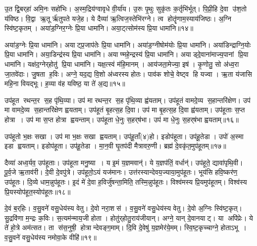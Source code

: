 उ॒त द्वि॒बर्‌हा॑ अमि॒नः सहो॑भिः।
अ॒स्म॒द्रिय॑ग्वावृधे वी॒र्या॑य।
उ॒रुः पृ॒थुः सुकृ॑तः क॒र्तृभि॑र्भूत्।
पि॒प्री॒हि दे॒वा उ॑श॒तो य॑विष्ठ।
वि॒द्वा ऋ॒तूर्\mbox{}ऋ॑तुपते यजे॒ह।
ये दैव्या॑ ऋ॒त्विज॒स्तेभि॑रग्ने।
त्व होतॄ॑णाम॒स्याय॑जिष्ठः।
अ॒ग्नि स्वि॑ष्ट॒कृतम्।
अया॑ड॒ग्निर॒ग्नेः प्रि॒या धामा॑नि।
अया॒ट्त्सोम॑स्य प्रि॒या धामा॑नि॥१४॥

अया॑ड॒ग्नेः प्रि॒या धामा॑नि।
अयाट्प्र॒जाप॑तेः प्रि॒या धामा॑नि।
अया॑ड॒ग्नीषोम॑योः प्रि॒या धामा॑नि।
अया॑डिन्द्राग्नि॒योः प्रि॒या धामा॑नि।
अया॒डिन्द्र॑स्य प्रि॒या धामा॑नि।
अयाण्महे॒न्द्रस्य॑ प्रि॒या धामा॑नि।
अयाड्दे॒वाना॑माज्य॒पानां प्रि॒या धामा॑नि।
यक्ष॑द॒ग्नेर्‌होतु॑ प्रि॒या धामा॑नि।
यक्ष॒त्स्वं म॑हि॒मानम्।
आय॑जता॒मेज्या॒ इष॑।
कृ॒णोतु॒ सो अ॑ध्व॒रा जा॒तवे॑दाः।
जु॒षता ह॒विः।
अग्ने॒ यद॒द्य वि॒शो अ॑ध्वरस्य होतः।
पाव॑क शोचे॒ वेष्ट्व हि यज्वा।
ऋ॒ता य॑जासि महि॒ना वियद्भूः।
ह॒व्या व॑ह यविष्ठ॒ या ते॑ अ॒द्य॥१५॥\anuvakamend[अ॒स्त्व॒ध॒त्त॒ र॒यिं च॑र्‌षणि॒प्राः सोम॑स्य प्रि॒या धामा॒नीष॒ष्षट्च॑]

उप॑हूत रथन्त॒र स॒ह पृ॑थि॒व्या।
उप॑ मा रथन्त॒र स॒ह पृ॑थि॒व्या ह्व॑यताम्।
उप॑हूतं वामदे॒व्य स॒हान्तरि॑क्षेण।
उप॑ मा वामदे॒व्य स॒हान्तरि॑क्षेण ह्वयताम्।
उप॑हूतं बृ॒हत्स॒ह दि॒वा।
उप॑ मा बृ॒हत्स॒ह दि॒वा ह्व॑यताम्।
उप॑हूताः स॒प्त होत्रा।
उप॑ मा स॒प्त होत्रा ह्वयन्ताम्।
उप॑हूता धे॒नुः स॒हर्‌ष॑भा।
उप॑ मा धे॒नुः स॒हर्‌ष॑भा ह्वयताम्॥१६॥

उप॑हूतो भ॒क्षः सखा।
उप॑ मा भ॒क्षः सखा ह्वयताम्।
उप॑हू॒ताँ(४)हो।
इडोप॑हूता।
उप॑हू॒तेडा।
उपो॑ अ॒स्मा इडा ह्वयताम्।
इडोप॑हूता।
उप॑हू॒तेडा।
मा॒न॒वी घृ॒तप॑दी मैत्रावरु॒णी।
ब्रह्म॑ दे॒वकृ॑त॒मुप॑हूतम्॥१७॥

दैव्या॑ अध्व॒र्यव॒ उप॑हूताः।
उप॑हूता मनु॒ष्या।
य इ॒मं य॒ज्ञमवान्॑।
ये य॒ज्ञप॑तिं॒ वर्धान्॑।
उप॑हूते॒ द्यावा॑पृथि॒वी।
पू॒र्व॒जे ऋ॒ताव॑री।
दे॒वी दे॒वपु॑त्रे।
उप॑हूतो॒ऽयं यज॑मानः।
उत्त॑रस्यान्देवय॒ज्याया॒मुप॑हूतः।
भूय॑सि हवि॒ष्कर॑ण॒ उप॑हूतः।
दि॒व्ये धाम॒न्नुप॑हूतः।
इ॒दं मे॑ दे॒वा ह॒विर्जु॑षन्ता॒मिति॒ तस्मि॒न्नुप॑हूतः।
विश्व॑मस्य प्रि॒यमुप॑हूतम्।
विश्व॑स्य प्रि॒यस्योप॑हूत॒स्योप॑हूतः॥१८॥\anuvakamend[स॒हर्‌ष॑भा ह्वयता॒मुप॑हूत हवि॒ष्कर॑ण॒ उप॑हूतश्च॒त्वारि॑ च]

दे॒वं ब॒र्‌हिः।
व॒सु॒वने॑ वसु॒धेय॑स्य वेतु।
दे॒वो नरा॒शस॑।
व॒सु॒वने॑ वसु॒धेय॑स्य वेतु।
दे॒वो अ॒ग्निः स्वि॑ष्ट॒कृत्।
सु॒द्रवि॑णा म॒न्द्रः क॒विः।
स॒त्यम॑न्माय॒जी होता।
होतु॑र्‌होतु॒राय॑जीयान्।
अग्ने॒ यान् दे॒वानयाट्।
या अपि॑प्रेः।
ये ते॑ हो॒त्रे अम॑त्सत।
ता स॑स॒नुषी॒ होत्रान्देवङ्ग॒माम्।
दि॒वि दे॒वेषु॑ य॒ज्ञमेर॑ये॒मम्।
स्वि॒ष्ट॒कृच्चाग्ने॒ होताऽभू।
व॒सु॒वने॑ वसु॒धेय॑स्य नमोवा॒के वीहि॑॥१९॥\anuvakamend[अपि॑प्रे॒ पञ्च॑ च]

